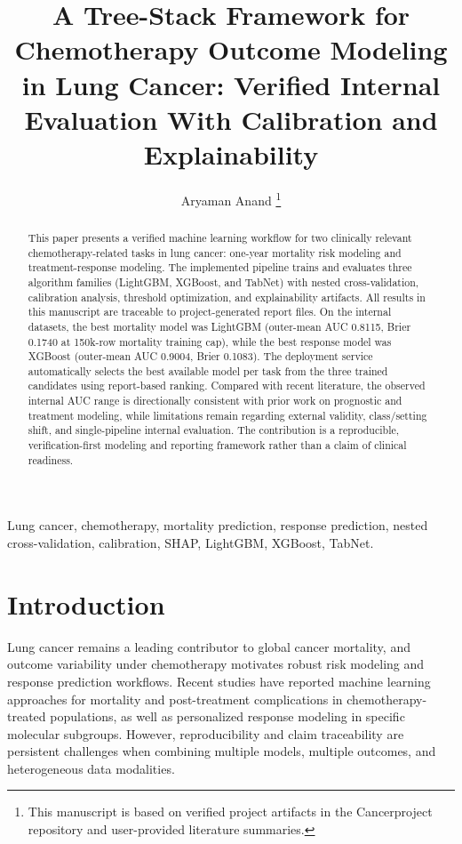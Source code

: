 \documentclass[journal]{IEEEtran}
\begin{document}
\title{A Tree-Stack Framework for Chemotherapy Outcome Modeling in Lung Cancer: \newline Verified Internal Evaluation With Calibration and Explainability}

\author{Aryaman Anand
\thanks{This manuscript is based on verified project artifacts in the Cancerproject repository and user-provided literature summaries.}}

\maketitle

\begin{abstract}
This paper presents a verified machine learning workflow for two clinically relevant chemotherapy-related tasks in lung cancer: one-year mortality risk modeling and treatment-response modeling. The implemented pipeline trains and evaluates three algorithm families (LightGBM, XGBoost, and TabNet) with nested cross-validation, calibration analysis, threshold optimization, and explainability artifacts. All results in this manuscript are traceable to project-generated report files. On the internal datasets, the best mortality model was LightGBM (outer-mean AUC 0.8115, Brier 0.1740 at 150k-row mortality training cap), while the best response model was XGBoost (outer-mean AUC 0.9004, Brier 0.1083). The deployment service automatically selects the best available model per task from the three trained candidates using report-based ranking. Compared with recent literature, the observed internal AUC range is directionally consistent with prior work on prognostic and treatment modeling, while limitations remain regarding external validity, class/setting shift, and single-pipeline internal evaluation. The contribution is a reproducible, verification-first modeling and reporting framework rather than a claim of clinical readiness.
\end{abstract}

\begin{IEEEkeywords}
Lung cancer, chemotherapy, mortality prediction, response prediction, nested cross-validation, calibration, SHAP, LightGBM, XGBoost, TabNet.
\end{IEEEkeywords}

\section{Introduction}
Lung cancer remains a leading contributor to global cancer mortality, and outcome variability under chemotherapy motivates robust risk modeling and response prediction workflows. Recent studies have reported machine learning approaches for mortality and post-treatment complications in chemotherapy-treated populations, as well as personalized response modeling in specific molecular subgroups. However, reproducibility and claim traceability are persistent challenges when combining multiple models, multiple outcomes, and heterogeneous data modalities.
\end{document}
